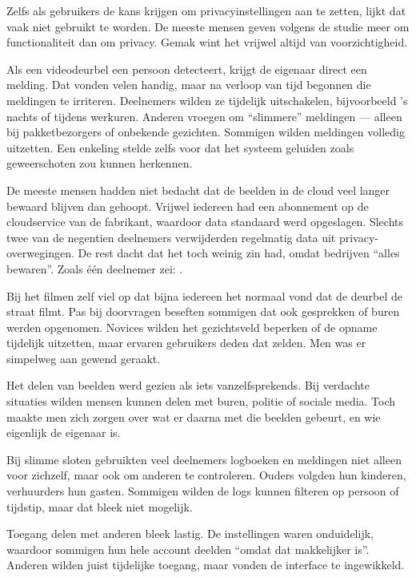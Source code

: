 \documentclass[nonacm,sigconf]{acmart}
\begin{document}
    Zelfs als gebruikers de kans krijgen om privacyinstellingen aan te zetten, lijkt dat vaak niet gebruikt te worden.
    De meeste mensen geven volgens de studie meer om functionaliteit dan om privacy.
    Gemak wint het vrijwel altijd van voorzichtigheid.

    Als een videodeurbel een persoon detecteert, krijgt de eigenaar direct een melding.
    Dat vonden velen handig, maar na verloop van tijd begonnen die meldingen te irriteren.
    Deelnemers wilden ze tijdelijk uitschakelen, bijvoorbeeld ’s nachts of tijdens werkuren.
    Anderen vroegen om “slimmere” meldingen — alleen bij pakketbezorgers of onbekende gezichten.
    Sommigen wilden meldingen volledig uitzetten.
    Een enkeling stelde zelfs voor dat het systeem geluiden zoals geweerschoten zou kunnen herkennen.

    De meeste mensen hadden niet bedacht dat de beelden in de cloud veel langer bewaard blijven dan gehoopt.
    Vrijwel iedereen had een abonnement op de cloudservice van de fabrikant, waardoor data standaard werd opgeslagen.
    Slechts twee van de negentien deelnemers verwijderden regelmatig data uit privacy-overwegingen.
    De rest dacht dat het toch weinig zin had, omdat bedrijven “alles bewaren”.
    Zoals één deelnemer zei:
    .

    Bij het filmen zelf viel op dat bijna iedereen het normaal vond dat de deurbel de straat filmt.
    Pas bij doorvragen beseften sommigen dat ook gesprekken of buren werden opgenomen.
    Novices wilden het gezichtsveld beperken of de opname tijdelijk uitzetten, maar ervaren gebruikers deden dat zelden.
    Men was er simpelweg aan gewend geraakt.

    Het delen van beelden werd gezien als iets vanzelfsprekends.
    Bij verdachte situaties wilden mensen kunnen delen met buren, politie of sociale media.
    Toch maakte men zich zorgen over wat er daarna met die beelden gebeurt, en wie eigenlijk de eigenaar is.

    Bij slimme sloten gebruikten veel deelnemers logboeken en meldingen niet alleen voor zichzelf, maar ook om anderen te controleren.
    Ouders volgden hun kinderen, verhuurders hun gasten.
    Sommigen wilden de logs kunnen filteren op persoon of tijdstip, maar dat bleek niet mogelijk.

    Toegang delen met anderen bleek lastig.
    De instellingen waren onduidelijk, waardoor sommigen hun hele account deelden “omdat dat makkelijker is”.
    Anderen wilden juist tijdelijke toegang, maar vonden de interface te ingewikkeld.
\end{document}
